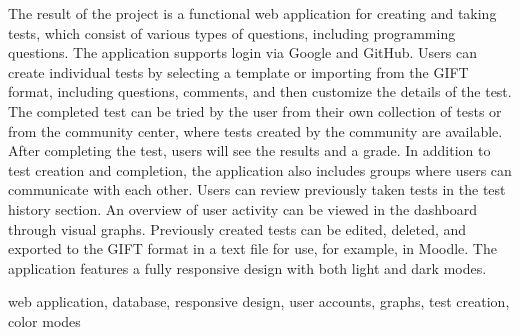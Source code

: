\documentclass[12pt, a4paper,
openright
]{report}
\begin{document}
	\vspace{18pt}


	
	\clearpage %
	\noindent The result of the project is a functional web application for creating and taking tests, which consist of various types of questions, including programming questions. The application supports login via Google and GitHub. Users can create individual tests by selecting a template or importing from the GIFT format, including questions, comments, and then customize the details of the test. The completed test can be tried by the user from their own collection of tests or from the community center, where tests created by the community are available. After completing the test, users will see the results and a grade. In addition to test creation and completion, the application also includes groups where users can communicate with each other. Users can review previously taken tests in the test history section. An overview of user activity can be viewed in the dashboard through visual graphs. Previously created tests can be edited, deleted, and exported to the GIFT format in a text file for use, for example, in Moodle. The application features a fully responsive design with both light and dark modes.
	
	\vspace{18pt}
	
	
	\noindent web application, database, responsive design, user accounts, graphs, test creation, color modes
	
	\vspace{18pt}

	\cleardoublepage

	
	\tableofcontents %

	\setcounter{page}{1} %

\end{document}
